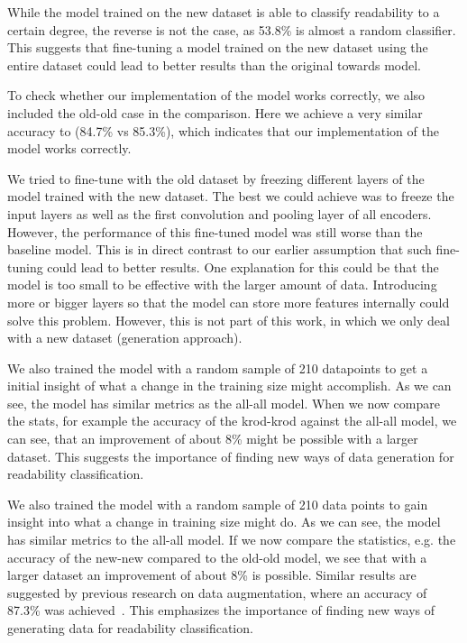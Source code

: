 \documentclass[%
class=scrreprt,
chapterprefix=false,%
open=right,%
twoside=false,%
paper=a4,%
logofile={Logo\_zentral\_farbig\_EN.png},%
thesistype=master,%
UKenglish,%
]{se2thesis}
\theoremstyle{definition}
\begin{document}
	While the model trained on the new dataset is able to classify readability to a certain degree, the reverse is not the case, as 53.8\% is almost a random classifier. This suggests that fine-tuning a model trained on the new dataset using the entire dataset could lead to better results than the original towards model.
	
	To check whether our implementation of the model works correctly, we also included the old-old case in the comparison. Here we achieve a very similar accuracy to \citeauthor{mi2022towards} (84.7\% vs 85.3\%), which indicates that our implementation of the model works correctly.
	
	We tried to fine-tune with the old dataset by freezing different layers of the model trained with the new dataset. The best we could achieve was to freeze the input layers as well as the first convolution and pooling layer of all encoders. However, the performance of this fine-tuned model was still worse than the baseline model. This is in direct contrast to our earlier assumption that such fine-tuning could lead to better results. One explanation for this could be that the model is too small to be effective with the larger amount of data. Introducing more or bigger layers so that the model can store more features internally could solve this problem. However, this is not part of this work, in which we only deal with a new dataset (generation approach).
	
	We also trained the model with a random sample of 210 datapoints to get a initial insight of what a change in the training size might accomplish. As we can see, the model has similar metrics as the all-all model. When we now compare the stats, for example the accuracy of the krod-krod against the all-all model, we can see, that an improvement of about 8\% might be possible with a larger dataset. This suggests the importance of finding new ways of data generation for readability classification.
	
	We also trained the model with a random sample of 210 data points to gain insight into what a change in training size might do. As we can see, the model has similar metrics to the all-all model. If we now compare the statistics, e.g. the accuracy of the new-new compared to the old-old model, we see that with a larger dataset an improvement of about 8\% is possible. Similar results are suggested by previous research on data augmentation, where an accuracy of 87.3\% was achieved~\citeauthor{mi2021effectiveness}. This emphasizes the importance of finding new ways of generating data for readability classification. 
	
\end{document}
